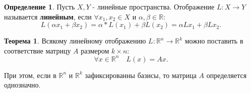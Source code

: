 \documentclass{report}
\theoremstyle{definition}
\newtheorem{definition}{Определение}[section]
\newtheorem{theorem}{Теорема}[section]
\begin{document}
\begin{definition}
  Пусть $X,Y$ - линейные пространства. Отображение $L: X \rightarrow Y$ называется \textbf{линейным}, если
  $\forall x_1,x_2 \in X$ и $\alpha,\beta \in \mathbb{R}$:
  \begin{equation*}
    L(\alpha x_1 + \beta x_2) = \alpha * L(x_1) + \beta L(x_2) = \alpha L x_1 + \beta L x_2.
  \end{equation*}
\end{definition}

\begin{theorem}
  Всякому линейному отображению $L:\mathbb{R}^n \rightarrow \mathbb{R}^k$ можно поставить в соответствие
  матрицу $A$ размером $k \times n$:
  \begin{equation*}
    \forall x \in \mathbb{R}^n \quad L(x) = Ax.
  \end{equation*}

  При этом, если в $\mathbb{R}^n$ и $\mathbb{R}^k$ зафиксированны базисы, то матрица $A$ определяется однозначно.
\end{theorem}
\end{document}
